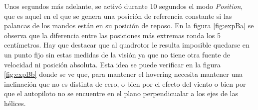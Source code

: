 Unos segundos más adelante, se activó durante 10 segundos el modo \textit{Position}, que es aquel en el que se genera una posición de referencia constante si las palancas de los mandos están en su posición de reposo. En la figura \ref{fig:expBa} se observa que la diferencia entre las posiciones más extremas ronda los 5 centímetros. Hay que destacar que al quadrotor le resulta imposible quedarse en un punto fijo sin estas medidas de la visión ya que no tiene otra fuente de velocidad ni posición absoluta. Esta idea se puede verificar en la figura \ref{fig:expBb} donde se ve que, para mantener el hovering necesita mantener una inclinación que no es distinta de cero, o bien por el efecto del viento o bien por que el autopiloto no se encuentre en el plano perpendicualar a los ejes de las hélices. 





\figVuelo
\figExpA
\figExpB

\endinput
